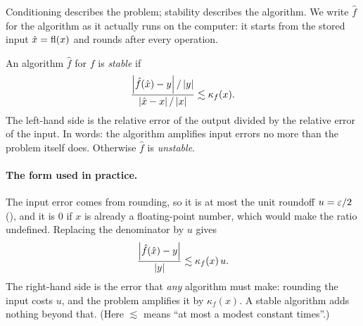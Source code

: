 Conditioning describes the problem; stability describes the algorithm. We write $\hat{f}$ for the algorithm as it actually runs on the computer: it starts from the stored input $\hat{x} = \operatorname{fl}(x)$ and rounds after every operation.

\begin{definition}[Stability]
  An algorithm $\hat{f}$ for $f$ is \emph{stable} if
  \begin{equation}
    \frac{\left\lvert \hat{f}(\hat{x}) - y \right\rvert/\left\lvert y \right\rvert}{\left\lvert \hat{x} - x \right\rvert/\left\lvert x \right\rvert} \lesssim \kappa_f(x).
  \end{equation}
  The left-hand side is the relative error of the output divided by the relative error of the input. In words: the algorithm amplifies input errors no more than the problem itself does. Otherwise $\hat{f}$ is \emph{unstable}.
\end{definition}

\paragraph{The form used in practice.} The input error comes from rounding, so it is at most the unit roundoff $u = \varepsilon/2$ (), and it is $0$ if $x$ is already a floating-point number, which would make the ratio undefined. Replacing the denominator by $u$ gives
\begin{equation}
  \frac{\left\lvert \hat{f}(\hat{x}) - y \right\rvert}{\left\lvert y \right\rvert} \lesssim \kappa_f(x)\, u.
\end{equation}
The right-hand side is the error that \emph{any} algorithm must make: rounding the input costs $u$, and the problem amplifies it by $\kappa_f(x)$. A stable algorithm adds nothing beyond that. (Here $\lesssim$ means ``at most a modest constant times''.)

